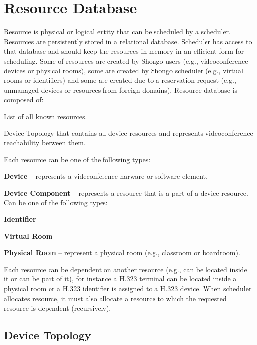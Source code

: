 \CodeStyle{} 
\CodeStyleAppendImplementation
\CodeStyleAppendEnum

\chapter{Resource Database}

Resource is physical or logical entity that can be scheduled by a scheduler. 
Resources are persistently stored in a relational database. Scheduler has 
access to that database and should keep the resources in memory in an 
efficient form for scheduling. Some of resources are created by Shongo users 
(e.g., videoconference devices or physical rooms), some are created by Shongo 
scheduler (e.g., virtual rooms or identifiers) and some are created due to a 
reservation request (e.g., unmanaged devices or resources from foreign 
domains). Resource database is composed of:
\begin{compactenum}
\item List of all known resources.
\item Device Topology that contains all device resources and represents 
videoconference reachability between them.
\end{compactenum}
Each resource can be one of the following types:
\begin{compactenum}
\item \textbf{Device} -- represents a videconference harware or software 
  element.
\item \textbf{Device Component} -- represents a resource that is a part of a 
  device resource. Can be one of the following types:
  \begin{compactenum}
    \item \textbf{Identifier}
    \item \textbf{Virtual Room}
  \end{compactenum}
\item \textbf{Physical Room} -- represent a physical room (e.g., classroom or 
  boardroom).
\end{compactenum}
Each resource can be dependent on another resource (e.g., can be located 
inside it or can be part of it), for instance a H.323 terminal can be located 
inside a physical room or a H.323 identifier is assigned to a H.323 device. 
When scheduler allocates resource, it must also allocate a resource to which 
the requested resource is dependent (recursively).

\section{Device Topology}

